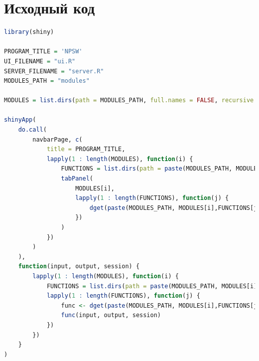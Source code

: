 \documentclass[14pt,a4paper]{scrartcl}
\begin{document}
    \section{Исходный код}
    \begin{lstlisting}[language=R]
library(shiny)

PROGRAM_TITLE = 'NPSW'
UI_FILENAME = "ui.R"
SERVER_FILENAME = "server.R"
MODULES_PATH = "modules"

MODULES = list.dirs(path = MODULES_PATH, full.names = FALSE, recursive = FALSE)

shinyApp(
    do.call(
        navbarPage, c(
            title = PROGRAM_TITLE,
            lapply(1 : length(MODULES), function(i) {
                FUNCTIONS = list.dirs(path = paste(MODULES_PATH, MODULES[i], sep="/"), full.names = FALSE, recursive = FALSE)
                tabPanel(
                    MODULES[i],
                    lapply(1 : length(FUNCTIONS), function(j) {
                        dget(paste(MODULES_PATH, MODULES[i],FUNCTIONS[j], UI_FILENAME, sep = "/"))
                    })
                )
            })
        )
    ),
    function(input, output, session) {
        lapply(1 : length(MODULES), function(i) {
            FUNCTIONS = list.dirs(path = paste(MODULES_PATH, MODULES[i], sep="/"), full.names = FALSE, recursive = FALSE)
            lapply(1 : length(FUNCTIONS), function(j) {
                func <- dget(paste(MODULES_PATH, MODULES[i],FUNCTIONS[j], SERVER_FILENAME, sep = "/"))
                func(input, output, session)
            })
        })
    }
)
    \end{lstlisting}
\end{document}
